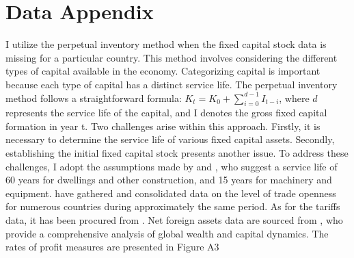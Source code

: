 \documentclass[10pt]{article}
\begin{document}
\section{Data Appendix}
I utilize the perpetual inventory method when the fixed capital stock data is missing for a particular country. This method involves considering the different types of capital available in the economy. Categorizing capital is important because each type of capital has a distinct service life. The perpetual inventory method follows a straightforward formula: $K_{t} = K_{0} + \sum_{i=0}^{d-1} I_{t-i}$, where $d$ represents the service life of the capital, and I denotes the gross fixed capital formation in year t. Two challenges arise within this approach. Firstly, it is necessary to determine the service life of various fixed capital assets. Secondly, establishing the initial fixed capital stock presents another issue. To address these challenges, I adopt the assumptions made by \citet{feinstein1998pessimism} and \citet{prados2010human}, who suggest a service life of 60 years for dwellings and other construction, and 15 years for machinery and equipment. \citet{JordaSchularickTaylor2017} have gathered and consolidated data on the level of trade openness for numerous countries during approximately the same period. As for the tariffs data, it has been procured from \citet{ClemensWilliamson2004}. Net foreign assets data are sourced from \citet{PikettyZucman2014}, who provide a comprehensive analysis of global wealth and capital dynamics. The rates of profit measures are presented in Figure A3
\end{document}
